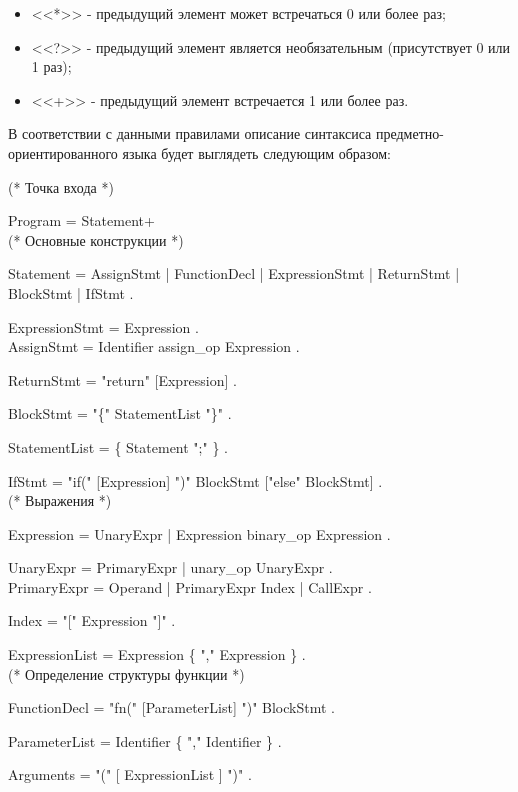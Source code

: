 \begin{itemize}
    \item <<*>> - предыдущий элемент может встречаться 0 или более раз;
    \item <<?>> - предыдущий элемент является необязательным (присутствует 0 или 1 раз);
    \item <<+>> - предыдущий элемент встречается 1 или более раз.
\end{itemize}

В соответствии с данными правилами описание синтаксиса предметно-ориентированного языка будет выглядеть следующим образом:

(* Точка входа *)

Program = Statement+ \\


(* Основные конструкции *)

Statement = AssignStmt | FunctionDecl | ExpressionStmt | ReturnStmt | BlockStmt | IfStmt .

ExpressionStmt = Expression . \\

AssignStmt = Identifier assign\_op Expression .

ReturnStmt = "{}return"{} [Expression] .

BlockStmt = "{}\{"{} StatementList "{}\}" .

StatementList = \{ Statement "{};"{} \} .

IfStmt = "{}if("{} [Expression] "{})"{} BlockStmt ["{}else"{} BlockStmt] . \\


(* Выражения *)

Expression = UnaryExpr | Expression binary\_op Expression . 

UnaryExpr = PrimaryExpr | unary\_op UnaryExpr . \\

PrimaryExpr = Operand | PrimaryExpr Index | CallExpr .

Index = "{}["{} Expression "{}]"{} .

ExpressionList = Expression \{ "{},"{} Expression \} . \\


(* Определение структуры функции *)

FunctionDecl = "{}fn("{} [ParameterList] "{})"{} BlockStmt .

ParameterList = Identifier \{ "{},"{} Identifier \} .

Arguments = "{}("{} [ ExpressionList ] "{})"{} .

